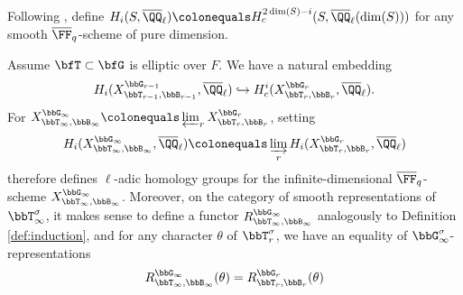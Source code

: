 Following \cite{Lus79}, define $H_i(S, \overline \QQ_\ell) \colonequals H_c^{2\dim(S)-i}(S, \overline \QQ_\ell(\dim(S)))$ for any smooth $\overline \FF_q$-scheme of pure dimension. 

\begin{corollary}\label{cor:infinite level}
  Assume $\bfT \subset \bfG$ is elliptic over $F$. We have a natural embedding
  \begin{equation*}
    H_i(X_{\bbT_{r-1},\bbB_{r-1}}^{\bbG_{r-1}}, \overline \QQ_\ell) \hookrightarrow H_c^i(X_{\bbT_r,\bbB_r}^{\bbG_r}, \overline \QQ_\ell).
  \end{equation*}
  For $X_{\bbT_\infty,\bbB_\infty}^{\bbG_\infty} \colonequals \varprojlim_r X_{\bbT_r,\bbB_r}^{\bbG_r}$, setting
  \begin{equation*}
    H_i(X_{\bbT_\infty,\bbB_\infty}^{\bbG_\infty}, \overline \QQ_\ell) \colonequals \varinjlim_r H_i(X_{\bbT_r,\bbB_r}^{\bbG_r}, \overline \QQ_\ell)
  \end{equation*}
  therefore defines $\ell$-adic homology groups for the infinite-dimensional $\overline \FF_q$-scheme $X_{\bbT_\infty,\bbB_\infty}^{\bbG_\infty}$. Moreover, on the category of smooth representations of $\bbT_\infty^\sigma$, it makes sense to define a functor $R_{\bbT_\infty,\bbB_\infty}^{\bbG_\infty}$ analogously to Definition \ref{def:induction}, and for any character $\theta$ of $\bbT_r^\sigma$, we have an equality of $\bbG_\infty^\sigma$-representations
  \begin{equation*}
    R_{\bbT_\infty,\bbB_\infty}^{\bbG_\infty}(\theta) = R_{\bbT_r,\bbB_r}^{\bbG_r}(\theta)
  \end{equation*}
\end{corollary}

